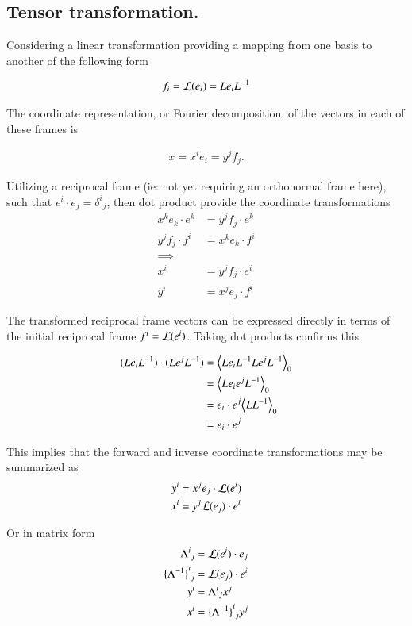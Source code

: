 \documentclass{article}
\newcommand{\Lor}[2]{{{\Lambda^{#1}}_{#2}}}
\newcommand{\ILor}[2]{{{ \{{\Lambda^{-1}\} }^{#1}}_{#2}}}
\begin{document}
\subsection{ Tensor transformation. }

Considering a linear transformation providing a mapping from one basis to another of the following form

\begin{align*}
f_i = \mathcal{L}(e_i) = L e_i L^{-1}
\end{align*}

The coordinate representation, or Fourier decomposition, of the vectors in each of these frames is

\begin{align*}
x = x^i e_i = y^j f_j.
\end{align*}

Utilizing a reciprocal frame (ie: not yet requiring an orthonormal frame here), such that $e^i \cdot e_j = {\delta^i}_j$, 
then dot product provide the coordinate transformations
\begin{align*}
x^k e_k \cdot e^k &= y^j f_j \cdot e^k \\
y^j f_j \cdot f^i &= x^k e_k \cdot f^i \\
\implies \\
x^i &= y^j f_j \cdot e^i \\
y^i &= x^j e_j \cdot f^i
\end{align*}

The transformed reciprocal frame vectors can be expressed directly in terms of the initial reciprocal frame $f^i = \mathcal{L}(e^i)$.  Taking
dot products confirms this

\begin{align*}
(L e_i L^{-1}) \cdot (L e^j L^{-1}) 
&= {\left\langle{{ L e_i L^{-1} L e^j L^{-1} }}\right\rangle}_{0} \\
&= {\left\langle{{ L e_i e^j L^{-1} }}\right\rangle}_{0} \\
&= e_i \cdot e^j {\left\langle{{ L L^{-1} }}\right\rangle}_{0} \\
&= e_i \cdot e^j
\end{align*}

This implies that the forward and inverse coordinate transformations may be summarized as
\begin{align*}
y^i &= x^j e_j \cdot \mathcal{L}(e^i) \\
x^i &= y^j \mathcal{L}(e_j) \cdot e^i \\
\end{align*}

Or in matrix form
\begin{align}\label{eqn:coordinateTxTensors}
\Lor{i}{j} &= \LL(e^i) \cdot e_j \\
\ILor{i}{j} &= \LL(e_j) \cdot e^i \\
y^i &= \Lor{i}{j} x^j \\
x^i &= \ILor{i}{j} y^j
\end{align}
\end{document}
